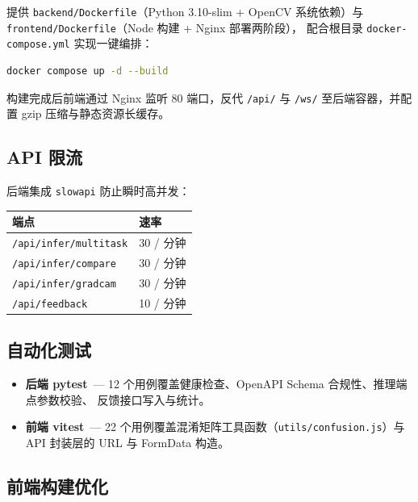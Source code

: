 \documentclass[12pt, a4paper, openany]{ctexbook}
\begin{document}
提供 \texttt{backend/Dockerfile}（Python 3.10-slim + OpenCV 系统依赖）与
\texttt{frontend/Dockerfile}（Node 构建 + Nginx 部署两阶段），
配合根目录 \texttt{docker-compose.yml} 实现一键编排：

\begin{lstlisting}[language=bash]
docker compose up -d --build
\end{lstlisting}

构建完成后前端通过 Nginx 监听 80 端口，反代 \texttt{/api/} 与 \texttt{/ws/}
至后端容器，并配置 gzip 压缩与静态资源长缓存。

\subsection{API 限流}

后端集成 \texttt{slowapi} 防止瞬时高并发：

\begin{center}
\begin{tabular}{ll}
  \toprule
  \textbf{端点} & \textbf{速率} \\
  \midrule
  \texttt{/api/infer/multitask} & 30 / 分钟 \\
  \texttt{/api/infer/compare}   & 30 / 分钟 \\
  \texttt{/api/infer/gradcam}   & 30 / 分钟 \\
  \texttt{/api/feedback}        & 10 / 分钟 \\
  \bottomrule
\end{tabular}
\end{center}

\subsection{自动化测试}

\begin{itemize}[leftmargin=*]
  \item \textbf{后端 pytest}\ —
        12 个用例覆盖健康检查、OpenAPI Schema 合规性、推理端点参数校验、
        反馈接口写入与统计。
  \item \textbf{前端 vitest}\ —
        22 个用例覆盖混淆矩阵工具函数（\texttt{utils/confusion.js}）与
        API 封装层的 URL 与 FormData 构造。
\end{itemize}

\subsection{前端构建优化}
\end{document}

